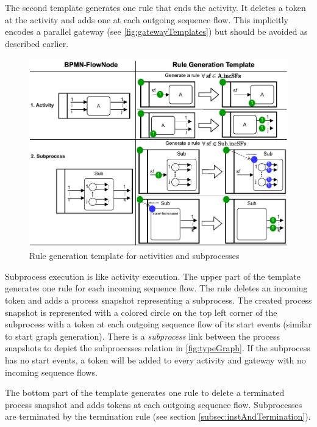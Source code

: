 \documentclass[runningheads]{llncs}
\begin{document}
The second template generates one rule that ends the activity.
It deletes a token at the activity and adds one at each outgoing sequence flow.
This implicitly encodes a parallel gateway (see \autoref{fig:gatewayTemplates}) but should be avoided as described earlier. 

\begin{figure}[ht]
    \centering
    \includegraphics[width=1\textwidth]{images/activities_template.pdf}
    \caption{Rule generation template for activities and subprocesses}
    \label{fig:activityTemplates}
\end{figure}

Subprocess execution is like activity execution.
The upper part of the template generates one rule for each incoming sequence flow.
The rule deletes an incoming token and adds a process snapshot representing a subprocess. 
The created process snapshot is represented with a colored circle on the top left corner of the subprocess with a token at each outgoing sequence flow of its start events (similar to start graph generation).
There is a \textit{subprocess} link between the process snapshots to depict the \textsf{subprocesses} relation in \autoref{fig:typeGraph}.
If the subprocess has no start events, a token will be added to every activity and gateway with no incoming sequence flows.

The bottom part of the template generates one rule to delete a terminated process snapshot and adds tokens at each outgoing sequence flow.
Subprocesses are terminated by the termination rule (see section \ref{subsec:instAndTermination}).
\end{document}
